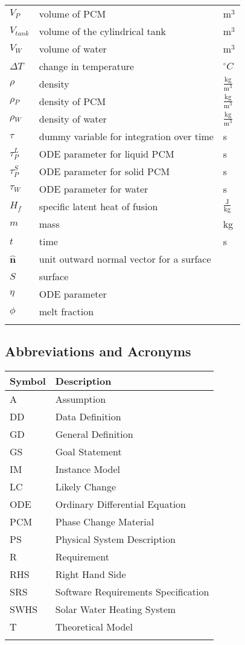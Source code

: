 \documentclass[12pt]{article}
\begin{document}
\begin{longtable*}{l l l}
\\
$V_{P}$ & volume of PCM & $\text{m}^{3}$
\\
$V_{tank}$ & volume of the cylindrical tank & $\text{m}^{3}$
\\
$V_{W}$ & volume of water & $\text{m}^{3}$
\\
$\Delta{}T$ & change in temperature & ${}^{\circ}C$
\\
$\rho{}$ & density & $\frac{\text{kg}}{\text{m}^{3}}$
\\
$\rho{}_{P}$ & density of PCM & $\frac{\text{kg}}{\text{m}^{3}}$
\\
$\rho{}_{W}$ & density of water & $\frac{\text{kg}}{\text{m}^{3}}$
\\
$\tau{}$ & dummy variable for integration over time & s
\\
$\tau{}_{P}^{L}$ & ODE parameter for liquid PCM & s
\\
$\tau{}_{P}^{S}$ & ODE parameter for solid PCM & s
\\
$\tau{}_{W}$ & ODE parameter for water & s
\\
$H_{f}$ & specific latent heat of fusion & $\frac{\text{J}}{\text{kg}}$
\\
$m$ & mass & kg
\\
$t$ & time & s
\\
$\mathbf{\hat{n}}$ & unit outward normal vector for a surface & 
\\
$S$ & surface & 
\\
$\eta{}$ & ODE parameter & 
\\
$\phi{}$ & melt fraction & 
\\
\bottomrule
\label{Table:ToS}
\end{longtable*}
\subsection{Abbreviations and Acronyms}
\label{Sec:AaA}
\begin{longtable*}{l l}
\toprule
Symbol & Description
\\
\midrule
A & Assumption
\\
DD & Data Definition
\\
GD & General Definition
\\
GS & Goal Statement
\\
IM & Instance Model
\\
LC & Likely Change
\\
ODE & Ordinary Differential Equation
\\
PCM & Phase Change Material
\\
PS & Physical System Description
\\
R & Requirement
\\
RHS & Right Hand Side
\\
SRS & Software Requirements Specification
\\
SWHS & Solar Water Heating System
\\
T & Theoretical Model
\\
\bottomrule
\label{Table:AaA}
\end{longtable*}
\end{document}
